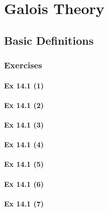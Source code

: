 \setcounter{chapter}{0}
\renewcommand{\thechapter}{14}
\chapter{Galois Theory}\label{ch:14}
\setcounter{equation}{0}	        %

\section{Basic Definitions}\label{sec:14.1}	
\subsection*{Exercises}\label{sec:14.1_Exercises}

\subsubsection{Ex 14.1 (1)}\label{sec:Ex_14.1.1}

\subsubsection{Ex 14.1 (2)}\label{sec:Ex_14.1.2}

\subsubsection{Ex 14.1 (3)}\label{sec:Ex_14.1.3}

\subsubsection{Ex 14.1 (4)}\label{sec:Ex_14.1.4}

\subsubsection{Ex 14.1 (5)}\label{sec:Ex_14.1.5}

\subsubsection{Ex 14.1 (6)}\label{sec:Ex_14.1.6}

\subsubsection{Ex 14.1 (7)}\label{sec:Ex_14.1.7}

